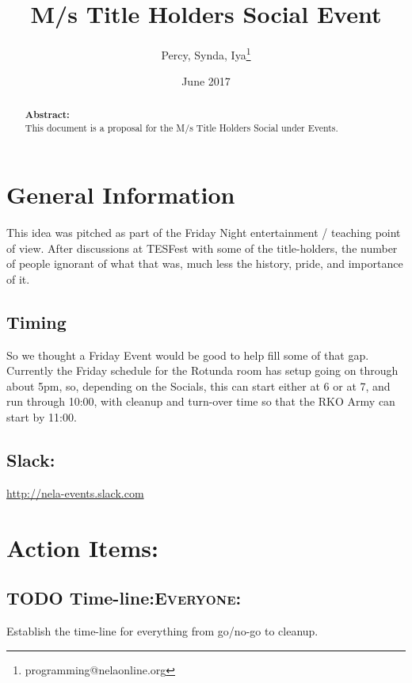\documentclass[captions=tablesignature]{scrartcl}
\author{Percy, Synda, Iya\thanks{programming@nelaonline.org}}
\date{June 2017}
\title{M/s Title Holders Social Event}
\begin{document}
\maketitle
{}
\thispagestyle{fancy}
\renewcommand{\headrulewidth}{0pt}
\renewcommand{\footrulewidth}{0pt}
\lhead{}
\rhead{}
\chead{}
\lfoot{}
\cfoot{}
\rfoot{}
\begin{abstract}
\vspace{5cm}
{\LARGE{\textbf{Abstract:\\}}}
This document is a proposal for the M/s Title Holders Social under Events.
\end{abstract}
\newpage
\renewcommand{\headrulewidth}{1pt}
\renewcommand{\footrulewidth}{1pt}
\rfoot{\thepage}
\setcounter{tocdepth}{2}
\tableofcontents
\newpage
{}
\section{General Information}
\label{sec-1}
This idea was pitched as part of the Friday Night entertainment /
teaching point of view.  After discussions at TESFest with some of
the title-holders, the number of people ignorant of what that was,
much less the history, pride, and importance of it.  
\subsection{Timing}
\label{sec-1-1}
So we thought a Friday Event would be good to help fill some of
that gap.  Currently the Friday schedule for the Rotunda room has
setup going on through about 5pm, so, depending on the Socials,
this can start either at 6 or at 7, and run through 10:00, with
cleanup and turn-over time so that the RKO Army can start by
11:00.

\subsection{Slack:}
\label{sec-1-2}
\url{http://nela-events.slack.com}

\section{Action Items:}
\label{sec-2}
\subsection{{\bfseries\sffamily TODO} Time-line\hfill{}\textsc{:Everyone:}}
\label{sec-2-1}
Establish the time-line for everything from go/no-go to cleanup.
\end{document}
